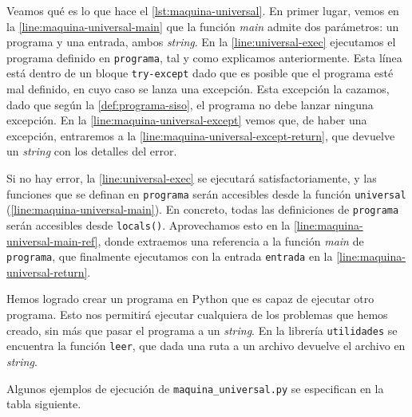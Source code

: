 Veamos qué es lo que hace el \cref{lst:maquina-universal}. En primer lugar, vemos en la \cref{line:maquina-universal-main} que la función \emph{main} admite dos parámetros: un programa y una entrada, ambos \emph{string}. En la \cref{line:universal-exec} ejecutamos el programa definido en \texttt{programa}, tal y como explicamos anteriormente. Esta línea está dentro de un bloque \texttt{try-except} dado que es posible que el programa esté mal definido, en cuyo caso se lanza una excepción. Esta excepción la cazamos, dado que según la \cref{def:programa-siso}, el programa no debe lanzar ninguna excepción. En la \cref{line:maquina-universal-except} vemos que, de haber una excepción, entraremos a la \cref{line:maquina-universal-except-return}, que devuelve un \emph{string} con los detalles del error.

Si no hay error, la \cref{line:universal-exec} se ejecutará satisfactoriamente, y las funciones que se definan en \texttt{programa} serán accesibles desde la función \texttt{universal} (\cref{line:maquina-universal-main}). En concreto, todas las definiciones de \texttt{programa} serán accesibles desde \texttt{locals()}. Aprovechamos esto en la \cref{line:maquina-universal-main-ref}, donde extraemos una referencia a la función \emph{main} de \texttt{programa}, que finalmente ejecutamos con la entrada \texttt{entrada} en la \cref{line:maquina-universal-return}.

Hemos logrado crear un programa en Python que es capaz de ejecutar otro programa. Esto nos permitirá ejecutar cualquiera de los problemas que hemos creado, sin más que pasar el programa a un \emph{string}. En la librería \texttt{utilidades} se encuentra la función \texttt{leer}, que dada una ruta a un archivo devuelve el archivo en \emph{string}.

Algunos ejemplos de ejecución de \texttt{maquina\_universal.py} se especifican en la tabla siguiente.

